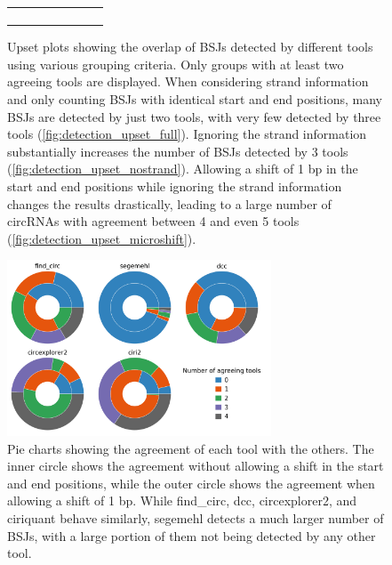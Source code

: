 \begin{figure}[ht]
\begin{tabular}{cc}
{\begin{subfigure}{\textwidth}
            \end{subfigure}}
    \end{tabular}
    \caption{Upset plots showing the overlap of BSJs detected by different
        tools using various grouping criteria.
        Only groups with at least two agreeing tools are displayed.
        When considering strand information and only counting BSJs with identical start
        and end positions, many BSJs are detected by just two tools, with very few
        detected by three tools (\cref{fig:detection_upset_full}).
        Ignoring the strand information substantially increases the number of BSJs
        detected by 3 tools (\cref{fig:detection_upset_nostrand}).
        Allowing a shift of 1 bp in the start and end positions while ignoring the
        strand information changes the results drastically, leading to a large number
        of circRNAs with agreement between 4 and even 5 tools
        (\cref{fig:detection_upset_microshift}).
    }
    \label{fig:detection_upset}
\end{figure}

\begin{figure}[ht]
    \centering

    \includegraphics[width=0.7\textwidth]{chapters/4_results_and_discussion/figures/detection/pies.png}
    \caption{Pie charts showing the agreement of each tool with the others.
        The inner circle shows the agreement without allowing a shift in the start and
        end positions, while the outer circle shows the agreement when allowing a shift
        of 1 bp.
        While find\_circ, dcc, circexplorer2, and ciriquant behave similarly, segemehl
        detects a much larger number of BSJs, with a large portion of them not being
        detected by any other tool.
    }
    \label{fig:detection_pies}
\end{figure}

